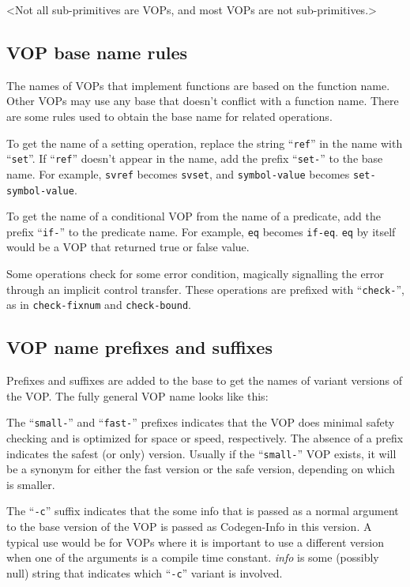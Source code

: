 \comment<Not all sub-primitives are VOPs, and most VOPs are not sub-primitives.>


\subsection{VOP base name rules}

The names of VOPs that implement functions are based on the function name.
Other VOPs may use any base that doesn't conflict with a function name.  There
are some rules used to obtain the base name for related operations.

To get the name of a setting operation, replace the string ``{\tt ref}'' in the name
with ``{\tt set}''.  If ``{\tt ref}'' doesn't appear in the name, add the prefix ``{\tt set-}'' to the
base name.  For example, {\tt svref} becomes {\tt svset}, and {\tt symbol-value}
becomes {\tt set-symbol-value}.

To get the name of a conditional VOP from the name of a predicate, add the
prefix ``{\tt if-}'' to the predicate name.  For example, {\tt eq} becomes {\tt if-eq}.
{\tt eq} by itself would be a VOP that returned true or false value.

Some operations check for some error condition, magically signalling the error
through an implicit control transfer.  These operations are prefixed with
``{\tt check-}'', as in {\tt check-fixnum} and {\tt check-bound}.


\subsection{VOP name prefixes and suffixes}

Prefixes and suffixes are added to the base to get the names of variant
versions of the VOP.  The fully general VOP name looks like this:
\begin{format}
   {``{\tt small-}'' | ``{\tt fast-}''} {\it name}{``{\tt -c}'' {\it info}}{``{\tt /}'' {\it type}{``{\tt =>}'' {\it result-type}}
\end{format}
The ``{\tt small-}'' and ``{\tt fast-}'' prefixes indicates that the VOP does minimal
safety checking and is optimized for space or speed, respectively.  The absence
of a prefix indicates the safest (or only) version.  Usually if the ``{\tt small-}''
VOP exists, it will be a synonym for either the fast version or the safe
version, depending on which is smaller.

The ``{\tt -c}'' suffix indicates that the some info that is passed as a normal
argument to the base version of the VOP is passed as Codegen-Info in this
version.  A typical use would be for VOPs where it is important to use a
different version when one of the arguments is a compile time constant.
{\it info} is some (possibly null) string that indicates which ``{\tt -c}'' variant
is involved.

